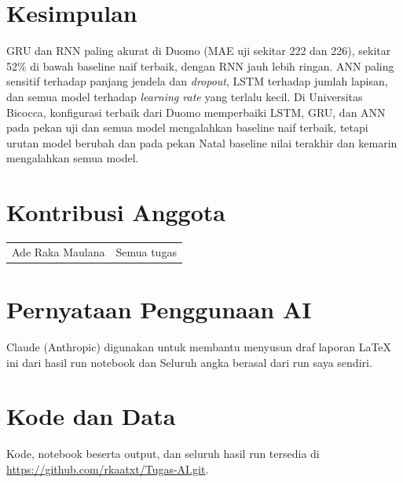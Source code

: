 \documentclass[conference,a4paper]{IEEEtran}
\begin{document}
\section{Kesimpulan}
GRU dan RNN paling akurat di Duomo (MAE uji sekitar 222 dan 226), sekitar 52\% di bawah baseline naif terbaik, dengan RNN jauh lebih ringan. ANN paling sensitif terhadap panjang jendela dan \emph{dropout}, LSTM terhadap jumlah lapisan, dan semua model terhadap \emph{learning rate} yang terlalu kecil. Di Universitas Bicocca, konfigurasi terbaik dari Duomo memperbaiki LSTM, GRU, dan ANN pada pekan uji dan semua model mengalahkan baseline naif terbaik, tetapi urutan model berubah dan pada pekan Natal baseline nilai terakhir dan kemarin mengalahkan semua model.

\section*{Kontribusi Anggota}
\begin{tabular}{@{}ll@{}}
Ade Raka Maulana & Semua tugas \\
\end{tabular}

\section*{Pernyataan Penggunaan AI}
Claude (Anthropic) digunakan untuk membantu menyusun draf laporan LaTeX ini dari hasil run notebook dan Seluruh angka berasal dari run saya sendiri.

\section*{Kode dan Data}
Kode, notebook beserta output, dan seluruh hasil run tersedia di \url{https://github.com/rkaatxt/Tugas-AI.git}.



\end{document}
